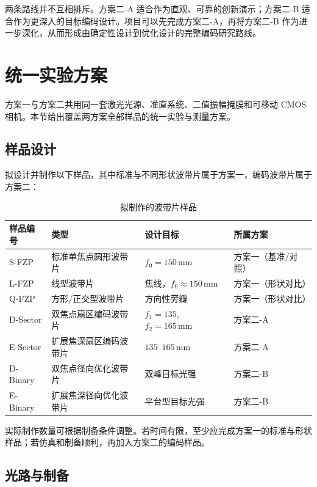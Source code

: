 \documentclass[UTF8,a4paper,11pt]{ctexart}
\begin{document}
两条路线并不互相排斥。方案二-A 适合作为直观、可靠的创新演示；方案二-B 适合作为更深入的目标编码设计。项目可以先完成方案二-A，再将方案二-B 作为进一步深化，从而形成由确定性设计到优化设计的完整编码研究路线。

\section{统一实验方案}

方案一与方案二共用同一套激光光源、准直系统、二值振幅掩膜和可移动 CMOS 相机。本节给出覆盖两方案全部样品的统一实验与测量方案。

\subsection{样品设计}

拟设计并制作以下样品，其中标准与不同形状波带片属于方案一，编码波带片属于方案二：

\begin{table}[H]
\centering
\caption{拟制作的波带片样品}
\label{tab:samples}
\begin{tabular}{llll}
\toprule
样品编号 & 类型 & 设计目标 & 所属方案 \\
\midrule
S-FZP & 标准单焦点圆形波带片 & $f_0=150\,\mathrm{mm}$ & 方案一（基准/对照） \\
L-FZP & 线型波带片 & 焦线，$f_0\approx150\,\mathrm{mm}$ & 方案一（形状对比） \\
Q-FZP & 方形/正交型波带片 & 方向性旁瓣 & 方案一（形状对比） \\
D-Sector & 双焦点扇区编码波带片 & $f_1=135$, $f_2=165\,\mathrm{mm}$ & 方案二-A \\
E-Sector & 扩展焦深扇区编码波带片 & $135$--$165\,\mathrm{mm}$ & 方案二-A \\
D-Binary & 双焦点径向优化波带片 & 双峰目标光强 & 方案二-B \\
E-Binary & 扩展焦深径向优化波带片 & 平台型目标光强 & 方案二-B \\
\bottomrule
\end{tabular}
\end{table}

实际制作数量可根据制备条件调整。若时间有限，至少应完成方案一的标准与形状样品；若仿真和制备顺利，再加入方案二的编码样品。

\subsection{光路与制备}
\end{document}

